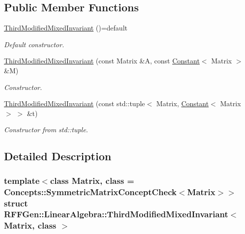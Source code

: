 \subsection*{Public Member Functions}
\begin{DoxyCompactItemize}
\item 
\hypertarget{structRFFGen_1_1LinearAlgebra_1_1ThirdModifiedMixedInvariant_a1739098d1de2ffbdaa0f148e9d1adba1}{\hyperlink{structRFFGen_1_1LinearAlgebra_1_1ThirdModifiedMixedInvariant_a1739098d1de2ffbdaa0f148e9d1adba1}{Third\-Modified\-Mixed\-Invariant} ()=default}\label{structRFFGen_1_1LinearAlgebra_1_1ThirdModifiedMixedInvariant_a1739098d1de2ffbdaa0f148e9d1adba1}

\begin{DoxyCompactList}\small\item\em Default constructor. \end{DoxyCompactList}\item 
\hyperlink{structRFFGen_1_1LinearAlgebra_1_1ThirdModifiedMixedInvariant_aea5e2e2d814d5bfe7f483ba6ea4bfd1d}{Third\-Modified\-Mixed\-Invariant} (const Matrix \&A, const \hyperlink{structRFFGen_1_1Constant}{Constant}$<$ Matrix $>$ \&M)
\begin{DoxyCompactList}\small\item\em Constructor. \end{DoxyCompactList}\item 
\hyperlink{structRFFGen_1_1LinearAlgebra_1_1ThirdModifiedMixedInvariant_acc8f71842804062958f2e2068fb70609}{Third\-Modified\-Mixed\-Invariant} (const std\-::tuple$<$ Matrix, \hyperlink{structRFFGen_1_1Constant}{Constant}$<$ Matrix $>$ $>$ \&t)
\begin{DoxyCompactList}\small\item\em Constructor from std\-::tuple. \end{DoxyCompactList}\end{DoxyCompactItemize}


\subsection{Detailed Description}
\subsubsection*{template$<$class Matrix, class = Concepts\-::\-Symmetric\-Matrix\-Concept\-Check$<$\-Matrix$>$$>$struct R\-F\-F\-Gen\-::\-Linear\-Algebra\-::\-Third\-Modified\-Mixed\-Invariant$<$ Matrix, class $>$}

